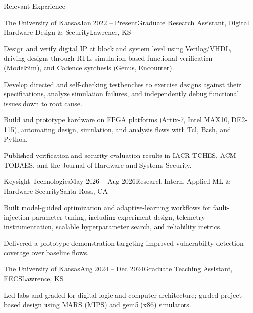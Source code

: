 \begin{rSection}{Relevant Experience}

\begin{rSubsection}{The University of Kansas}{Jan 2022 -- Present}{Graduate Research Assistant, Digital Hardware Design \& Security}{Lawrence, KS}
\item Design and verify digital IP at block and system level using Verilog/VHDL, driving designs through RTL, simulation-based functional verification (ModelSim), and Cadence synthesis (Genus, Encounter).
\item Develop directed and self-checking testbenches to exercise designs against their specifications, analyze simulation failures, and independently debug functional issues down to root cause.
\item Build and prototype hardware on FPGA platforms (Artix-7, Intel MAX10, DE2-115), automating design, simulation, and analysis flows with Tcl, Bash, and Python.
\item Published verification and security evaluation results in IACR TCHES, ACM TODAES, and the Journal of Hardware and Systems Security.
\end{rSubsection}

\begin{rSubsection}{Keysight Technologies}{May 2026 -- Aug 2026}{Research Intern, Applied ML \& Hardware Security}{Santa Rosa, CA}
\item Built model-guided optimization and adaptive-learning workflows for fault-injection parameter tuning, including experiment design, telemetry instrumentation, scalable hyperparameter search, and reliability metrics.
\item Delivered a prototype demonstration targeting improved vulnerability-detection coverage over baseline flows.
\end{rSubsection}

\begin{rSubsection}{The University of Kansas}{Aug 2024 -- Dec 2024}{Graduate Teaching Assistant, EECS}{Lawrence, KS}
\item Led labs and graded for digital logic and computer architecture; guided project-based design using MARS (MIPS) and gem5 (x86) simulators.
\end{rSubsection}

\end{rSection}
